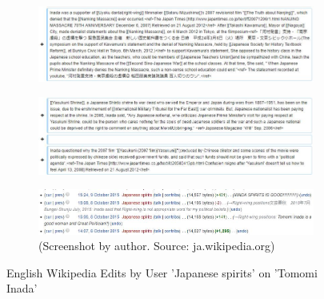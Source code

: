 \documentclass[10pt,british,A4paper,,openany]{memoir}
\begin{document}
\begin{figure}[!htb]
 \centering
 \begin{subfigure}[b]{0.9\textwidth}
  \includegraphics[width=\textwidth]{images/wiki/japanese-spirits-inada1.jpg}
 \end{subfigure}
 \begin{subfigure}[b]{0.9\textwidth}
  \includegraphics[width=\textwidth]{images/wiki/japanese-spirits-inada2.jpg}
 \end{subfigure}
 \begin{subfigure}[b]{0.9\textwidth}
  \includegraphics[width=\textwidth]{images/wiki/japanese-spirits-inada0.jpg}
  \caption*{(Screenshot by author. Source: ja.wikipedia.org)}
 \end{subfigure}
 \caption{English Wikipedia Edits by User 'Japanese spirits' on 'Tomomi Inada'}\label{fig:js-inada}
\end{figure}
\end{document}
